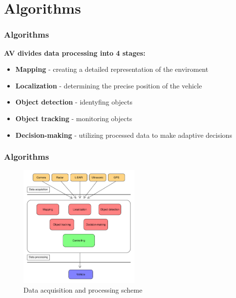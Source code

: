 \documentclass[xcolor=dvipsnames]{beamer}
\begin{document}

\section{Algorithms}

\begin{frame}[fragile=singleslide]\frametitle{\bf{Algorithms}}

\begin{block}{\textbf{AV divides data processing into 4 stages:}}
         \begin{itemize}
	\item {\bf{Mapping}} - creating a detailed representation of the enviroment
	\item {\bf{Localization}} - determining the precise position of the vehicle
	\item {\bf{Object detection}} - identyfing objects 
	\item {\bf{Object tracking}} - monitoring objects
	\item {\bf{Decision-making}} - utilizing processed data to make adaptive decisions
	\end{itemize}
\end{block}
\end{frame}


\begin{frame}[fragile=singleslide]\frametitle{\bf{Algorithms}}
\centering
    \begin{figure}
    \centering
    \caption{Data acquisition and processing scheme}
    \vspace*{-.2cm}
    \includegraphics[width=6cm]{algoritmy.pdf}
    \end{figure}
\end{frame}
\end{document}
